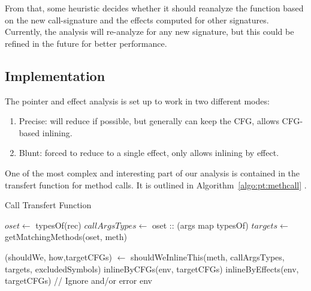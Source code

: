 \documentclass[a4paper]{article}
\begin{document}
From that, some heuristic decides whether it should reanalyze the function
based on the new call-signature and the effects computed for other signatures.
Currently, the analysis will re-analyze for any new signature, but this could
be refined in the future for better performance.

\subsection{Implementation}
The pointer and effect analysis is set up to work in two different modes:
\begin{enumerate}
    \item Precise: will reduce if possible, but generally can keep the CFG,
    allows CFG-based inlining.
    \item Blunt: forced to reduce to a single effect, only allows inlining by
    effect.
\end{enumerate}

One of the most complex and interesting part of our analysis is contained in
the transfert function for method calls. It is outlined in
Algorithm~\ref{algo:pt:methcall} .

\begin{algorithm}
\caption{Call Transfert Function}\label{algo:pt:methcall}
\begin{algorithmic}[1]
    \State $oset \gets$ typesOf(rec)
    \State $callArgsTypes \gets$ oset :: (args map typesOf)
    \State $targets \gets$ getMatchingMethods(oset, meth)

    \State (shouldWe, how,targetCFGs) $\gets$ shouldWeInlineThis(meth, callArgsTypes, targets, excludedSymbols)
            \State \Return inlineByCFGs(env, targetCFGs)
        \Else
            \State \Return inlineByEffects(env, targetCFGs)
        \EndIf
    \Else
        \State // Ignore and/or error
        \State \Return env
    \EndIf
\EndFunction
\end{algorithmic}
\end{algorithm}
\end{document}
